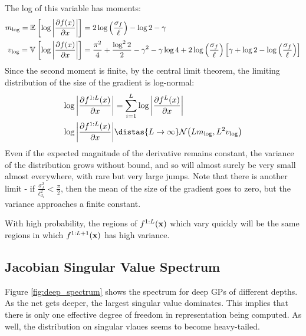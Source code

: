 \documentclass{article}
\begin{document}
The log of this variable has moments:
\begin{align}
m_{\log} = \mathbb{E}_{} \left[ {\log \left| \frac{\partial f(x)}{\partial x} \right|} \right] & = 2 \log \left( \frac{\sigma_f}{\ell} \right) - \log2 - \gamma \\
v_{\log} = \mathbb{V}_{} \left[ {\log \left| \frac{\partial f(x)}{\partial x} \right|} \right] & = \frac{\pi^2}{4} + \frac{\log^2 2}{2}  - \gamma^2 - \gamma \log4 + 2 \log\left(\frac{\sigma_f}{\ell}\right) \left[ \gamma + \log2 - \log \left(\frac{\sigma_f}{\ell}\right) \right] 
\end{align}
Since the second moment is finite, by the central limit theorem, the limiting distribution of the size of the gradient is log-normal:
\begin{align}
\log \left| \frac{\partial f^{1:L}(x)}{\partial x} \right| 
& = \sum_{i=1}^L \log \left| \frac{\partial f^{L}(x)}{\partial x} \right| \\
\log \left| \frac{\partial f^{1:L}(x)}{\partial x} \right| & \distas{L \rightarrow \infty} \Nt{ L m_{\log} }{L^2 v_{\log}}
\end{align}
%
Even if the expected magnitude of the derivative remains constant, the variance of the distribution grows without bound, and so will almost surely be very small almost everywhere, with rare but very large jumps.
Note that there is another limit - if $\frac{\sigma^2_f}{\ell_{d_1}^2} < \frac{\pi}{2}$, then the mean of the size of the gradient goes to zero, but the variance approaches a finite constant.

With high probability, the regions of $f^{1:L}({\bf{x}})$ which vary quickly will be the same regions in which $f^{1:L + 1}({\bf{x}})$  has high variance.

\subsection{Jacobian Singular Value Spectrum}

Figure \ref{fig:deep_spectrum} shows the spectrum for deep GPs of different depths.  As the net gets deeper, the largest singular value dominates.  This implies that there is only one effective degree of freedom in representation being computed.  As well, the distribution on singular vlaues seems to become heavy-tailed.
\end{document}
